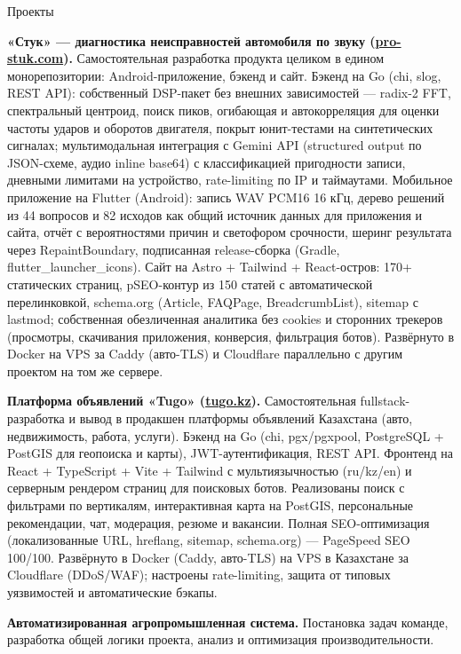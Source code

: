 \documentclass{resume} %
\begin{document}
\begin{rSection}{Проекты}
\vspace{-1.25em}
\item \textbf{«Стук» — диагностика неисправностей автомобиля по звуку (\href{https://pro-stuk.com}{pro-stuk.com}).} {Самостоятельная разработка продукта целиком в едином монорепозитории: Android-приложение, бэкенд и сайт. Бэкенд на Go (chi, slog, REST API): собственный DSP-пакет без внешних зависимостей — radix-2 FFT, спектральный центроид, поиск пиков, огибающая и автокорреляция для оценки частоты ударов и оборотов двигателя, покрыт юнит-тестами на синтетических сигналах; мультимодальная интеграция с Gemini API (structured output по JSON-схеме, аудио inline base64) с классификацией пригодности записи, дневными лимитами на устройство, rate-limiting по IP и таймаутами. Мобильное приложение на Flutter (Android): запись WAV PCM16 16 кГц, дерево решений из 44 вопросов и 82 исходов как общий источник данных для приложения и сайта, отчёт с вероятностями причин и светофором срочности, шеринг результата через RepaintBoundary, подписанная release-сборка (Gradle, flutter\_launcher\_icons). Сайт на Astro + Tailwind + React-остров: 170+ статических страниц, pSEO-контур из 150 статей с автоматической перелинковкой, schema.org (Article, FAQPage, BreadcrumbList), sitemap с lastmod; собственная обезличенная аналитика без cookies и сторонних трекеров (просмотры, скачивания приложения, конверсия, фильтрация ботов). Развёрнуто в Docker на VPS за Caddy (авто-TLS) и Cloudflare параллельно с другим проектом на том же сервере.}
\item \textbf{Платформа объявлений «Tugo» (\href{https://tugo.kz}{tugo.kz}).} {Самостоятельная fullstack-разработка и вывод в продакшен платформы объявлений Казахстана (авто, недвижимость, работа, услуги). Бэкенд на Go (chi, pgx/pgxpool, PostgreSQL + PostGIS для геопоиска и карты), JWT-аутентификация, REST API. Фронтенд на React + TypeScript + Vite + Tailwind с мультиязычностью (ru/kz/en) и серверным рендером страниц для поисковых ботов. Реализованы поиск с фильтрами по вертикалям, интерактивная карта на PostGIS, персональные рекомендации, чат, модерация, резюме и вакансии. Полная SEO-оптимизация (локализованные URL, hreflang, sitemap, schema.org) — PageSpeed SEO 100/100. Развёрнуто в Docker (Caddy, авто-TLS) на VPS в Казахстане за Cloudflare (DDoS/WAF); настроены rate-limiting, защита от типовых уязвимостей и автоматические бэкапы.}
\item \textbf{Автоматизированная агропромышленная система.} {Постановка задач команде, разработка общей логики проекта, анализ и оптимизация производительности.}

\end{rSection}
\end{document}
